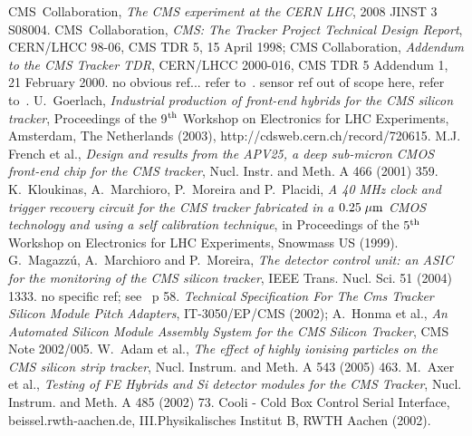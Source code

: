 \begin{thebibliography}{9}
 CMS~Collaboration, {\em The CMS experiment at
    the CERN LHC}, 2008 JINST 3 S08004.
 CMS~Collaboration, {\em CMS: The Tracker Project
    Technical Design Report}, CERN/LHCC 98-06, CMS TDR 5, 15 April
  1998; CMS Collaboration, {\em Addendum to the CMS Tracker TDR}, CERN/LHCC
  2000-016, CMS TDR 5 Addendum 1, 21 February 2000.
 no obvious ref... refer to~\cite{bigcmspaper}.
 sensor ref out of scope here, refer to~\cite{bigcmspaper}. 
 U.~Goerlach, {\em Industrial production of front-end
    hybrids for the CMS silicon tracker}, Proceedings of the 9$^{\rm
    th}$ Workshop on Electronics for LHC Experiments, Amsterdam, The
  Netherlands (2003), http://cdsweb.cern.ch/record/720615.
 M.J. French et al., {\em Design and results from the
    APV25, a deep sub-micron CMOS front-end chip for the CMS tracker},
  Nucl. Instr. and Meth. A 466 (2001) 359.
 K.~Kloukinas, A.~Marchioro, P.~Moreira and P.~Placidi,
  {\em A 40 MHz clock and trigger recovery circuit for the CMS tracker
    fabricated in a $0.25{\; \mu \rm m}$ CMOS technology and using a self
    calibration technique}, in Proceedings of the $5^{\rm th}$
  Workshop on Electronics for LHC Experiments, Snowmass US (1999).
 G.~Magazz\'u, A.~Marchioro and P.~Moreira, {\em The
    detector control unit: an ASIC for the monitoring of the CMS
    silicon tracker}, IEEE Trans. Nucl. Sci. 51 (2004) 1333.
 no specific ref; see~\cite{bigcmspaper} p 58. 
 {\em Technical Specification For The Cms Tracker Silicon
  Module Pitch Adapters}, IT-3050/EP/CMS (2002);
 A.~Honma et al., {\em An Automated Silicon Module
    Assembly System for the CMS Silicon Tracker}, CMS Note 2002/005.
 W.~Adam et al., {\em The effect of highly ionising
    particles on the CMS silicon strip tracker}, Nucl. Instrum. and
  Meth. A 543 (2005) 463.
 M.~Axer et al., {\em Testing of FE Hybrids and Si
    detector modules for the CMS Tracker}, Nucl. Instrum. and Meth. A
  485 (2002) 73.
 Cooli - Cold Box Control Serial Interface,
  beissel\@physik.rwth-aachen.de, III.Physikalisches Institut B, RWTH
  Aachen (2002).
\end{thebibliography}
